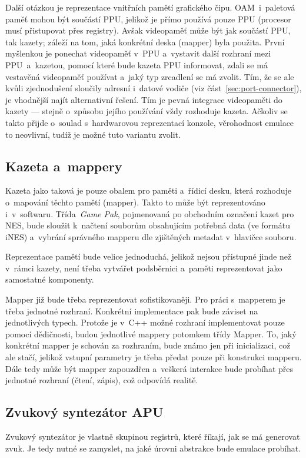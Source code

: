 Další otázkou je reprezentace vnitřních pamětí grafického čipu. OAM~i~paletová paměť mohou být součástí PPU, jelikož je přímo používá pouze PPU (procesor musí přistupovat přes registry). Avšak videopaměť může být jak součástí PPU, tak kazety; záleží na tom, jaká konkrétní deska (mapper) byla použita. První myšlenkou je ponechat videopaměť v~PPU a~vystavit další rozhraní mezi PPU~a~kazetou, pomocí které bude kazeta PPU informovat, zdali se má vestavěná videopaměť používat a~jaký typ zrcadlení se má zvolit. Tím, že se ale kvůli zjednodušení sloučily adresní i~datové vodiče (viz část~\ref{sec:port-connector}), je vhodnější najít alternativní řešení. Tím je pevná integrace videopaměti do kazety --- stejně o~způsobu jejího používání vždy rozhoduje kazeta. Ačkoliv se takto přijde o~soulad s~hardwarovou reprezentací konzole, věrohodnost emulace to neovlivní, tudíž je možné tuto variantu zvolit.

\subsection{Kazeta a~mappery}
Kazeta jako taková je pouze obalem pro paměti a~řídicí desku, která rozhoduje o~mapování těchto pamětí (mapper). Takto to může být reprezentováno i~v~softwaru. Třída~\emph{Game Pak}, pojmenovaná po obchodním označení kazet pro NES, bude sloužit k~načtení souborům obsahujícím potřebná data (ve formátu iNES) a~vybrání správného mapperu dle zjištěných metadat v~hlavičce souboru.

Reprezentace pamětí bude velice jednoduchá, jelikož nejsou přístupné jinde než v~rámci kazety, není třeba vytvářet podsběrnici a~paměti reprezentovat jako samostatné komponenty. 

Mapper již bude třeba reprezentovat sofistikovaněji. Pro práci s~mapperem je třeba jednotné rozhraní. Konkrétní implementace pak bude záviset na jednotlivých typech. Protože je v~C++ možné rozhraní implementovat pouze pomocí dědičnosti, budou jednotlivé mappery potomkem třídy Mapper. To, jaký konkrétní mapper je schován za rozhraním, bude známo jen při inicializaci, což ale stačí, jelikož vstupní parametry je třeba předat pouze při konstrukci mapperu. Dále tedy může být mapper zapouzdřen a~veškerá interakce bude probíhat přes jednotné rozhraní (čtení, zápis), což odpovídá realitě.

\subsection{Zvukový syntezátor APU}
Zvukový syntezátor je vlastně skupinou registrů, které říkají, jak se má generovat zvuk. Je tedy nutné se zamyslet, na jaké úrovni abstrakce bude emulace probíhat.

